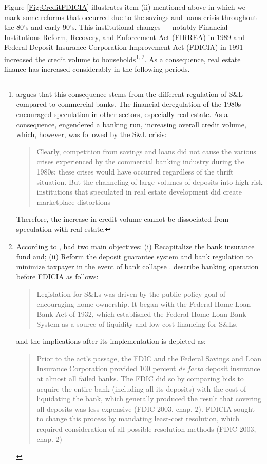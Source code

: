 \documentclass[11pt]{article}
\begin{document}
Figure \ref{Fig:CreditFDICIA} illustrates item (ii) mentioned above in which we mark some reforms that occurred due to the savings and loans crisis throughout the 80's and early 90's.
This institutional changes --- notably Financial Institutions Reform, Recovery, and Enforcement Act (FIRREA) in 1989 and Federal Deposit Insurance Corporation Improvement Act  (FDICIA) in 1991 --- increased the credit volume to households\footnote{\textcite{federal_deposit_insurance_corporation_savings_1997} argues that this consequence stems from the different regulation of S\&L compared to commercial banks. The financial deregulation of the 1980s encouraged speculation in other sectors, especially real estate. As a consequence, engendered a banking run, increasing overall credit volume, which, however, was followed by the S\&L crisis:
\begin{quotation}
Clearly, competition from savings and loans did not cause the various crises experienced by the commercial banking industry during the 1980s; these crises would have occurred regardless of the thrift situation. But the channeling of large volumes of deposits into high-risk institutions that speculated in real estate development did create marketplace distortions \cite[p.~168]{federal_deposit_insurance_corporation_savings_1997}
\end{quotation}
Therefore, the increase in credit volume cannot be dissociated from speculation with real estate.}\textsuperscript{,}\,\footnote{According to \textcite{federal_deposit_insurance_corporation_savings_1997}, had two main objectives:
		(i) Recapitalize the bank insurance fund and;
		(ii) Reform the deposit guarantee system and bank regulation to minimize  taxpayer in the event of bank collapse \cite{mishkin_evaluating_1997}.
		\textcite[p.~170]{federal_deposit_insurance_corporation_savings_1997} describe banking operation before FDICIA as follows:
\begin{quotation}
Legislation for S\&Ls was driven by the public policy goal of encouraging home ownership. It began with the Federal Home Loan Bank Act of 1932, which established the Federal Home Loan Bank System as a source of liquidity and low-cost financing for S\&Ls.
\end{quotation}
and the implications after its implementation is depicted as:
\begin{quotation}
Prior to the act’s passage, the FDIC and the Federal Savings and Loan Insurance Corporation provided 100 percent \textit{de facto} deposit insurance at almost all failed banks. The FDIC did so by comparing bids to acquire the entire bank (including all its deposits) with the cost of liquidating the bank, which generally produced the result that covering all deposits was less expensive (FDIC 2003, chap. 2). FDICIA sought to change this process by mandating least-cost resolution, which required consideration of all possible resolution methods (FDIC 2003, chap. 2) \cite[p.~iii]{wall_too_2010}
\end{quotation}}. 
As a consequence, real estate finance has increased considerably in the following periods.
\end{document}
